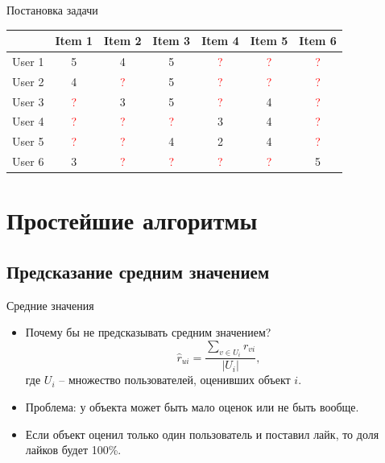 \documentclass[9pt]{beamer}
\begin{document}
\begin{frame}{Постановка задачи}
\begin{center}
    \begin{tabular}{|c|c|c|c|c|c|c|}
    \hline
         & Item 1 & Item 2 & Item 3 & Item 4 & Item 5 & Item 6 \\\hline
    User 1 & 5 & 4 & 5 & \textcolor{red}{?} & \textcolor{red}{?} & \textcolor{red}{?} \\\hline
    User 2 & 4 & \textcolor{red}{?} & 5 & \textcolor{red}{?} & \textcolor{red}{?} & \textcolor{red}{?} \\\hline
    User 3 & \textcolor{red}{?} & 3 & 5 & \textcolor{red}{?} & 4 & \textcolor{red}{?} \\\hline
    User 4 & \textcolor{red}{?} & \textcolor{red}{?} & \textcolor{red}{?} & 3 & 4 & \textcolor{red}{?} \\\hline
    User 5 & \textcolor{red}{?} & \textcolor{red}{?} & 4 & 2 & 4 & \textcolor{red}{?} \\\hline
    User 6 & 3 & \textcolor{red}{?} & \textcolor{red}{?} & \textcolor{red}{?} & \textcolor{red}{?} & 5\\\hline
    \end{tabular}
\end{center}
\end{frame}

\section{Простейшие алгоритмы}

\subsection{Предсказание средним значением}

\begin{frame}{Средние значения}
\begin{itemize}
    \item Почему бы не предсказывать средним значением?
    $$\hat r_{ui} = \frac{\sum\limits_{v\in U_i} r_{vi}}{|U_i|},$$ 
    где $U_i$ – множество пользователей, оценивших объект $i$.
    \item Проблема: у объекта может быть мало оценок или не быть вообще.
    \item Если объект оценил только один пользователь и поставил лайк, то доля лайков будет 100\%.
\end{itemize}
\end{frame}
\end{document}

